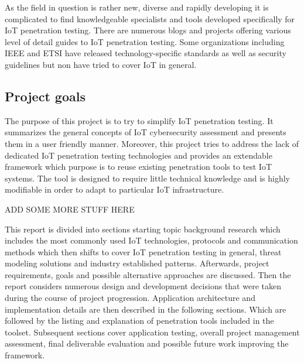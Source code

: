 As the field in question is rather new, diverse and rapidly developing it is complicated to find knowledgeable specialists and tools developed specifically for IoT penetration testing. There are numerous blogs and projects offering various level of detail guides to IoT penetration testing\cite{github}. Some organizations including IEEE and ETSI have released technology-specific standards as well as security guidelines but non have tried to cover IoT in general\cite{Zhao:2013:SIT:2584913.2585964}. 

\subsection{Project goals}
The purpose of this project is to try to simplify IoT penetration testing. It summarizes the general concepts of IoT cybersecurity assessment and presents them in a user friendly manner. Moreover, this project tries to address the lack of dedicated IoT penetration testing technologies and provides an extendable framework which purpose is to reuse existing penetration tools to test IoT systems. The tool is designed to require little technical knowledge and is highly modifiable in order to adapt to particular IoT infrastructure.

ADD SOME MORE STUFF HERE 

This report is divided into sections starting topic background research which includes the most commonly used IoT technologies, protocols and communication methods which then shifts to cover IoT penetration testing in general, threat modeling solutions and industry established patterns. Afterwards, project requirements, goals and possible alternative approaches are discussed. Then the report considers numerous design and development decisions that were taken during the course of project progression. Application architecture and implementation details are then described in the following sections. Which are followed by the listing and explanation of penetration tools included in the toolset. Subsequent sections cover application testing, overall project management assessment, final deliverable evaluation and possible future work improving the framework.